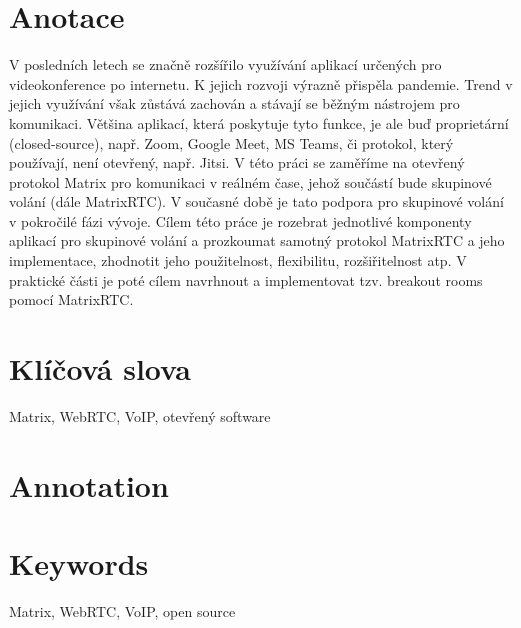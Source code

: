 \section*{Anotace}
V posledních letech se značně rozšířilo využívání aplikací určených pro
videokonference po internetu. K jejich rozvoji výrazně přispěla pandemie. Trend
v jejich využívání však zůstává zachován a stávají se běžným nástrojem pro
komunikaci. Většina aplikací, která poskytuje tyto funkce, je ale buď
proprietární (closed-source), např. Zoom, Google Meet, MS Teams, či protokol,
který používají, není otevřený, např. Jitsi. V této práci se zaměříme na
otevřený protokol Matrix pro komunikaci v reálném čase, jehož součástí bude
skupinové volání (dále MatrixRTC). V současné době je tato podpora pro skupinové
volání v pokročilé fázi vývoje. Cílem této práce je rozebrat jednotlivé
komponenty aplikací pro skupinové volání a prozkoumat samotný protokol MatrixRTC
a jeho implementace, zhodnotit jeho použitelnost, flexibilitu, rozšiřitelnost
atp. V praktické části je poté cílem navrhnout a implementovat tzv. breakout
rooms pomocí MatrixRTC.

\section*{Klíčová slova}
Matrix, WebRTC, VoIP, otevřený software

\section*{Annotation}

\section*{Keywords}
Matrix, WebRTC, VoIP, open source

